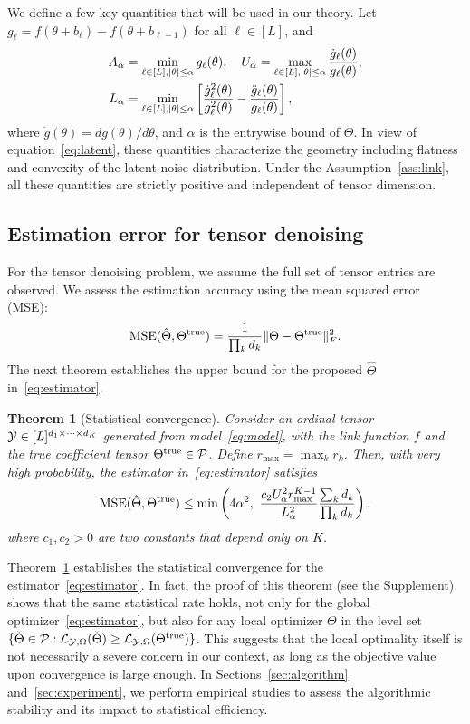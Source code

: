 \documentclass{article}
\theoremstyle{plain}
\newtheorem{thm}{Theorem}[section]
\theoremstyle{definition}
\begin{document}
We define a few key quantities that will be used in our theory. Let $g_\ell=f(\theta+b_\ell)-f(\theta+b_{\ell-1})$ for all $\ell\in[L]$, and
\begin{align}\label{eq:regular}
A_\alpha &= \min_{\ell\in[L], |\theta|\leq \alpha} g_\ell(\theta),\quad  U_\alpha=\max_{\ell\in[L], |\theta|\leq \alpha } {\dot{g}_\ell(\theta)\over g_\ell(\theta)},\\
 L_\alpha &= \min_{\ell\in[L], |\theta|\leq \alpha }\left[{\dot{g}_\ell^2 (\theta)\over g_\ell^2(\theta)} -{\ddot{g}_\ell(\theta)\over g_\ell(\theta)}\right],
\end{align}
where $\dot{g}(\theta)=dg(\theta)/d\theta$, and $\alpha$ is the entrywise bound of $\Theta$. In view of equation~\eqref{eq:latent}, these quantities characterize the geometry including flatness and convexity of the latent noise distribution. Under the Assumption~\ref{ass:link}, all these quantities are strictly positive and independent of tensor dimension. 

\subsection{Estimation error for tensor denoising}\label{sec:denosing}
For the tensor denoising problem, we assume the full set of tensor entries are observed. We assess the estimation accuracy using the mean squared error (MSE):
\[
\text{MSE}(\hat \Theta, \Theta^{\text{true}})={1\over \prod_k d_k}\lVert\Theta-\Theta^{\text{true}}\rVert_F^2.
\]
The next theorem establishes the upper bound for the proposed $\hat \Theta$ in~\eqref{eq:estimator}. 

\begin{thm}[Statistical convergence] \label{thm:rate}
Consider an ordinal tensor $\mathcal{Y}\in[L]^{d_1\times\dots\times d_K}$ generated from model~\eqref{eq:model}, with the link function $f$ and the true coefficient tensor $\Theta^{\text{true}}\in\mathcal{P}$. Define $r_{\max}=\max_k r_k$. Then, with very high probability, the estimator in~\eqref{eq:estimator} satisfies
\begin{equation}\label{eq:rate}
\text{MSE}(\hat \Theta, \trueT) \leq \min\left( 4\alpha^2,\ {c_2  U^2_\alpha r_{\max}^{K-1}  \over  L^2_\alpha } {\sum_kd_k\over  \prod_k d_k} \right),
\end{equation}
where $c_1, c_2>0$ are two constants that depend only on $K$. 
\end{thm}
Theorem~\ref{thm:rate} establishes the statistical convergence for the estimator~\eqref{eq:estimator}. In fact, the proof of this theorem (see the Supplement) shows that the same statistical rate holds, not only for the global optimizer~\eqref{eq:estimator}, but also for any local optimizer $\check \Theta$ in the level set $\{\check\Theta\in\mathcal{P}: \mathcal{L}_{\mathcal{Y},\Omega}(\check\Theta)\geq \mathcal{L}_{\mathcal{Y},\Omega}(\Theta^{\text{true}})\}$. This suggests that the local optimality itself is not necessarily a severe concern in our context, as long as the objective value upon convergence is large enough. In Sections~\ref{sec:algorithm} and~\ref{sec:experiment}, we perform empirical studies to assess the algorithmic stability and its impact to statistical efficiency. 
\end{document}
